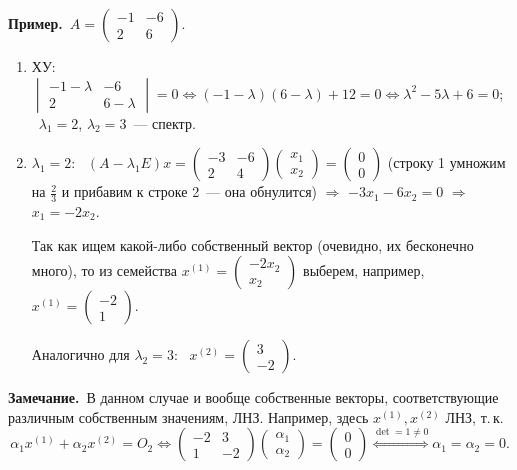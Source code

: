 \documentclass[a4paper,11pt]{article}
\newcommand{\zam}{\textbf{Замечание.}\ }
\newcommand{\prim}{\textbf{Пример.}\ }
\begin{document}
\prim $A=\begin{pmatrix}-1&-6\\2&6\end{pmatrix}$.
\begin{enumerate}[label=\arabic*.]
\item ХУ: $\begin{vmatrix}-1-\lambda&-6\\2&6-\lambda\end{vmatrix}=0\iff(-1-\lambda)(6-\lambda)+12=0
\iff\lambda^2-5\lambda+6=0$; \ $\lambda_1=2$, $\lambda_2=3$~--- спектр.
\item $\lambda_1=2$: \ $(A-\lambda_1E)x=\begin{pmatrix}-3&-6\\2&4\end{pmatrix}\begin{pmatrix}x_1\\x_2\end{pmatrix}
=\begin{pmatrix}0\\0\end{pmatrix}$ (строку 1 умножим на $\frac23$ и прибавим к строке 2~--- она
обнулится) $\Rightarrow$ $-3x_1-6x_2=0$ $\Rightarrow$ $x_1=-2x_2$.

Так как ищем какой-либо собственный вектор (очевидно, их бесконечно много), то из семейства
$x^{(1)}=\begin{pmatrix}-2x_2\\x_2\end{pmatrix}$ выберем, например, $x^{(1)}=\begin{pmatrix}-2\\1\end{pmatrix}$.

Аналогично для $\lambda_2=3$: \ $x^{(2)}=\begin{pmatrix}3\\-2\end{pmatrix}$.
\end{enumerate}

\zam В данном случае и вообще собственные векторы, соответствующие различным собственным
значениям, ЛНЗ. Например, здесь $x^{(1)},x^{(2)}$ ЛНЗ, т.\,к.
\[
\alpha_1x^{(1)}+\alpha_2x^{(2)}=O_2\iff
\begin{pmatrix}-2&3\\1&-2\end{pmatrix}\begin{pmatrix}\alpha_1\\\alpha_2\end{pmatrix}=\begin{pmatrix}0\\0\end{pmatrix}
\overset{\det=1\ne0}{\iff}\alpha_1=\alpha_2=0.
\]
\end{document}

